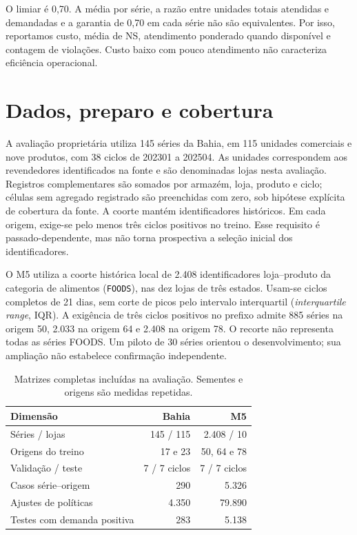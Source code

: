 O limiar é 0,70. A média por série, a razão entre unidades totais atendidas e demandadas e a garantia de 0,70 em cada série não são equivalentes. Por isso, reportamos custo, média de NS, atendimento ponderado quando disponível e contagem de violações. Custo baixo com pouco atendimento não caracteriza eficiência operacional.

\section{Dados, preparo e cobertura}
\label{sec:pipeline_experimental}\label{sec:ba2026_methods}
A avaliação proprietária utiliza 145 séries da Bahia, em 115 unidades comerciais e nove produtos, com 38 ciclos de 202301 a 202504. As unidades correspondem aos revendedores identificados na fonte e são denominadas lojas nesta avaliação. Registros complementares são somados por armazém, loja, produto e ciclo; células sem agregado registrado são preenchidas com zero, sob hipótese explícita de cobertura da fonte. A coorte mantém identificadores históricos. Em cada origem, exige-se pelo menos três ciclos positivos no treino. Esse requisito é passado-dependente, mas não torna prospectiva a seleção inicial dos identificadores.

O M5 utiliza a coorte histórica local de 2.408 identificadores loja--produto da categoria de alimentos (\texttt{FOODS}), nas dez lojas de três estados. Usam-se ciclos completos de 21 dias, sem corte de picos pelo intervalo interquartil (\textit{interquartile range}, IQR). A exigência de três ciclos positivos no prefixo admite 885 séries na origem 50, 2.033 na origem 64 e 2.408 na origem 78. O recorte não representa todas as séries FOODS. Um piloto de 30 séries orientou o desenvolvimento; sua ampliação não estabelece confirmação independente.

\begin{table}[htbp]\centering\small
\caption{Matrizes completas incluídas na avaliação. Sementes e origens são medidas repetidas.}\label{tab:temporal_coverage}
\begin{tabular}{@{}lrr@{}}\toprule
Dimensão & Bahia & M5\\\midrule
Séries / lojas & 145 / 115 & 2.408 / 10\\
Origens do treino & 17 e 23 & 50, 64 e 78\\
Validação / teste & 7 / 7 ciclos & 7 / 7 ciclos\\
Casos série--origem & 290 & 5.326\\
Ajustes de políticas & 4.350 & 79.890\\
Testes com demanda positiva & 283 & 5.138\\\bottomrule
\end{tabular}\end{table}

